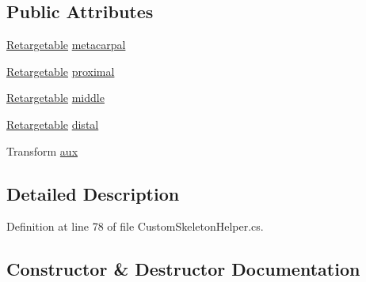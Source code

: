 \subsection*{Public Attributes}
\begin{DoxyCompactItemize}
\item 
\mbox{\hyperlink{class_valve_1_1_v_r_1_1_interaction_system_1_1_sample_1_1_custom_skeleton_helper_1_1_retargetable}{Retargetable}} \mbox{\hyperlink{class_valve_1_1_v_r_1_1_interaction_system_1_1_sample_1_1_custom_skeleton_helper_1_1_finger_a3cde839b56f062f47cbcac5cc5e2d39a}{metacarpal}}
\item 
\mbox{\hyperlink{class_valve_1_1_v_r_1_1_interaction_system_1_1_sample_1_1_custom_skeleton_helper_1_1_retargetable}{Retargetable}} \mbox{\hyperlink{class_valve_1_1_v_r_1_1_interaction_system_1_1_sample_1_1_custom_skeleton_helper_1_1_finger_a2951dda098a33603116e361b6588cb19}{proximal}}
\item 
\mbox{\hyperlink{class_valve_1_1_v_r_1_1_interaction_system_1_1_sample_1_1_custom_skeleton_helper_1_1_retargetable}{Retargetable}} \mbox{\hyperlink{class_valve_1_1_v_r_1_1_interaction_system_1_1_sample_1_1_custom_skeleton_helper_1_1_finger_aa69e359ff2229e93cac8dc63a15a0c24}{middle}}
\item 
\mbox{\hyperlink{class_valve_1_1_v_r_1_1_interaction_system_1_1_sample_1_1_custom_skeleton_helper_1_1_retargetable}{Retargetable}} \mbox{\hyperlink{class_valve_1_1_v_r_1_1_interaction_system_1_1_sample_1_1_custom_skeleton_helper_1_1_finger_aaf811ae11e7b634c2ff8857abc779691}{distal}}
\item 
Transform \mbox{\hyperlink{class_valve_1_1_v_r_1_1_interaction_system_1_1_sample_1_1_custom_skeleton_helper_1_1_finger_a2bdd542921c2e05451277a00e0f8471e}{aux}}
\end{DoxyCompactItemize}


\subsection{Detailed Description}


Definition at line 78 of file Custom\+Skeleton\+Helper.\+cs.



\subsection{Constructor \& Destructor Documentation}
\mbox{\label{class_valve_1_1_v_r_1_1_interaction_system_1_1_sample_1_1_custom_skeleton_helper_1_1_finger_a51ba48134fad73317d3857ccadea6dc1}} 
